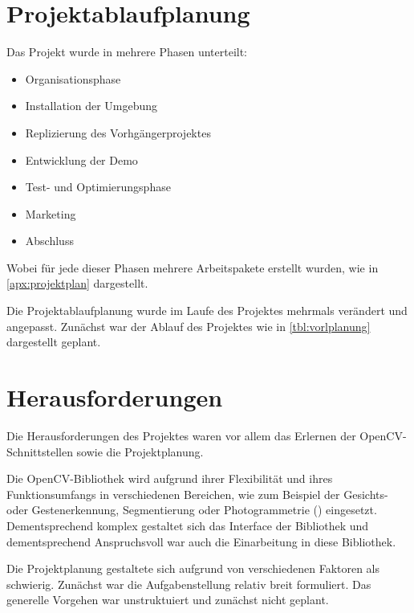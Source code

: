     \section{Projektablaufplanung}

        Das Projekt wurde in mehrere Phasen unterteilt:

        \begin{itemize}
            \item Organisationsphase
            \item Installation der Umgebung
            \item Replizierung des Vorhgängerprojektes
            \item Entwicklung der Demo
            \item Test- und Optimierungsphase
            \item Marketing
            \item Abschluss
        \end{itemize}

        Wobei für jede dieser Phasen mehrere Arbeitspakete erstellt wurden, wie
        in \ref{apx:projektplan} dargestellt.

        Die Projektablaufplanung wurde im Laufe des Projektes mehrmals verändert
        und angepasst.
        Zunächst war der Ablauf des Projektes wie in \autoref{tbl:vorlplanung}
        dargestellt geplant.

    \section{Herausforderungen}

        Die Herausforderungen des Projektes waren vor allem das Erlernen der
        OpenCV-Schnittstellen sowie die Projektplanung.

        Die OpenCV-Bibliothek wird aufgrund ihrer Flexibilität und ihres
        Funktionsumfangs in verschiedenen Bereichen, wie zum Beispiel der
        Gesichts- oder Gestenerkennung, Segmentierung oder Photogrammetrie
        (\cite{wiki:opencv}) eingesetzt.
        Dementsprechend komplex gestaltet sich das Interface der Bibliothek und
        dementsprechend Anspruchsvoll war auch die Einarbeitung in diese
        Bibliothek.

        Die Projektplanung gestaltete sich aufgrund von verschiedenen Faktoren
        als schwierig.
        Zunächst war die Aufgabenstellung relativ breit formuliert.
        Das generelle Vorgehen war unstruktuiert und zunächst nicht geplant.

